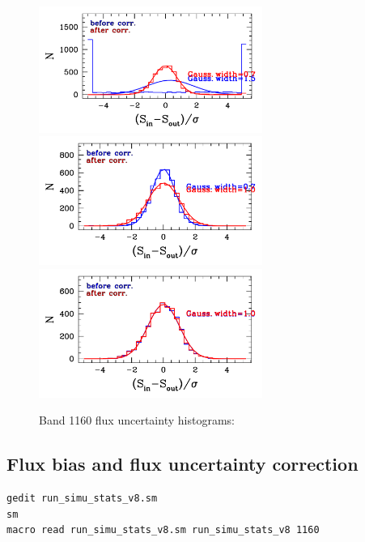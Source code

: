 \documentclass[11pt,a4paper]{article}
\begin{document}
\begin{figure}[H]
	\caption{
		Band 1160 flux uncertainty histograms:
	}
	\includegraphics[width=0.65\textwidth]{galsim_1160_hist_dfcorr_1}
	\includegraphics[width=0.65\textwidth]{galsim_1160_hist_dfcorr_2}
	\includegraphics[width=0.65\textwidth]{galsim_1160_hist_dfcorr_3}
\end{figure}


\subsection{Flux bias and flux uncertainty correction}
\label{Band1160_dfcorr}

\begin{lstlisting}[language=bash]
gedit run_simu_stats_v8.sm
sm
macro read run_simu_stats_v8.sm run_simu_stats_v8 1160
\end{lstlisting}


\clearpage
\end{document}
